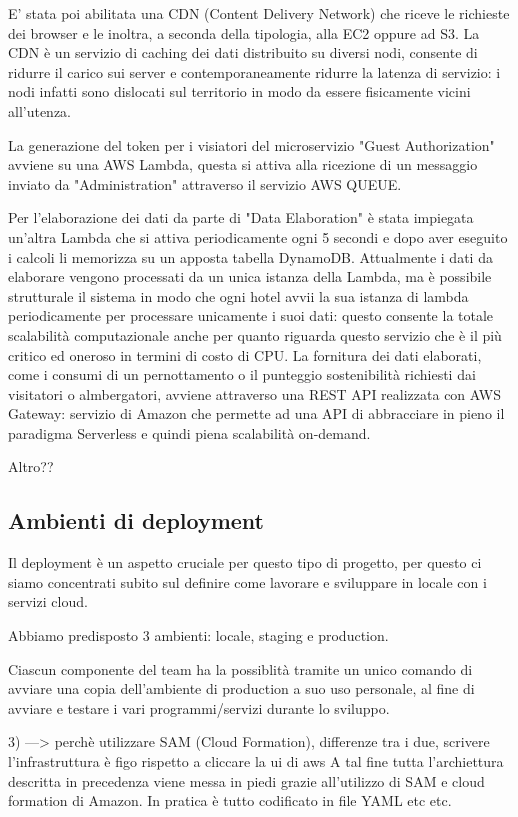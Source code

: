 E' stata poi abilitata una CDN (Content Delivery Network) che riceve le richieste dei browser e le inoltra, a seconda della tipologia, alla EC2 oppure ad S3.
La CDN è un servizio di caching dei dati distribuito su diversi nodi, consente di ridurre il carico sui server e contemporaneamente ridurre la latenza di servizio: 
i nodi infatti sono dislocati sul territorio in modo da essere fisicamente vicini all'utenza.

La generazione del token per i visiatori del microservizio "Guest Authorization" avviene su una AWS Lambda, questa si attiva alla ricezione di un messaggio inviato da "Administration" attraverso il servizio AWS QUEUE.

Per l'elaborazione dei dati da parte di "Data Elaboration" è stata impiegata un'altra Lambda che si attiva periodicamente ogni 5 secondi e dopo aver eseguito i calcoli li memorizza su un apposta tabella DynamoDB.
Attualmente i dati da elaborare vengono processati da un unica istanza della Lambda, ma è possibile strutturale il sistema in modo che ogni hotel avvii la sua istanza di lambda periodicamente 
per processare unicamente i suoi dati: questo consente la totale scalabilità computazionale anche per quanto riguarda questo servizio che è il più critico ed oneroso in termini di costo di CPU.
La fornitura dei dati elaborati, come i consumi di un pernottamento o il punteggio sostenibilità richiesti dai visitatori o almbergatori, avviene attraverso una REST API realizzata con AWS Gateway: 
servizio di Amazon che permette ad una API di abbracciare in pieno il paradigma Serverless e quindi piena scalabilità on-demand.

Altro??

\subsection{Ambienti di deployment}

Il deployment è un aspetto cruciale per questo tipo di progetto, per questo ci siamo concentrati subito sul definire come lavorare e sviluppare in locale con i servizi cloud.

Abbiamo predisposto 3 ambienti: locale, staging e production.

Ciascun componente del team ha la possiblità tramite un unico comando di avviare una copia dell'ambiente di production a suo uso personale, 
al fine di avviare e testare i vari programmi/servizi durante lo sviluppo.

3) ---> perchè utilizzare SAM (Cloud Formation), differenze tra i due, scrivere l'infrastruttura è figo rispetto a cliccare la ui di aws
A tal fine tutta l'archiettura descritta in precedenza viene messa in piedi grazie all'utilizzo di SAM e cloud formation di Amazon.
In pratica è tutto codificato in file YAML etc etc.

